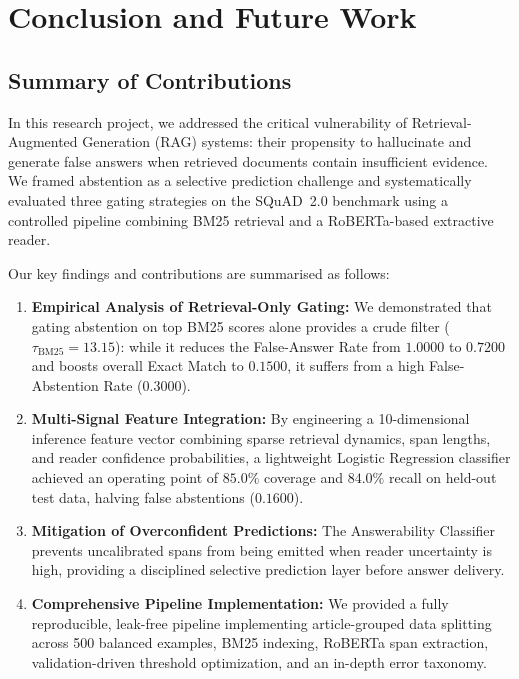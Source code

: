 \chapter{Conclusion and Future Work}
\label{chap:conclusion}

\section{Summary of Contributions}
\label{sec:conclusion_summary}

In this research project, we addressed the critical vulnerability of Retrieval-Augmented Generation (RAG) systems: their propensity to hallucinate and generate false answers when retrieved documents contain insufficient evidence. We framed abstention as a selective prediction challenge and systematically evaluated three gating strategies on the SQuAD~2.0 benchmark using a controlled pipeline combining BM25 retrieval and a RoBERTa-based extractive reader.

Our key findings and contributions are summarised as follows:

\begin{enumerate}
  \item \textbf{Empirical Analysis of Retrieval-Only Gating:} We demonstrated that gating abstention on top BM25 scores alone provides a crude filter ($\tau_{\text{BM25}} = 13.15$): while it reduces the False-Answer Rate from $1.0000$ to $0.7200$ and boosts overall Exact Match to $0.1500$, it suffers from a high False-Abstention Rate ($0.3000$).
  
  \item \textbf{Multi-Signal Feature Integration:} By engineering a 10-dimensional inference feature vector combining sparse retrieval dynamics, span lengths, and reader confidence probabilities, a lightweight Logistic Regression classifier achieved an operating point of $85.0\%$ coverage and $84.0\%$ recall on held-out test data, halving false abstentions ($0.1600$).
  
  \item \textbf{Mitigation of Overconfident Predictions:} The Answerability Classifier prevents uncalibrated spans from being emitted when reader uncertainty is high, providing a disciplined selective prediction layer before answer delivery.
  
  \item \textbf{Comprehensive Pipeline Implementation:} We provided a fully reproducible, leak-free pipeline implementing article-grouped data splitting across 500 balanced examples, BM25 indexing, RoBERTa span extraction, validation-driven threshold optimization, and an in-depth error taxonomy.
\end{enumerate}

